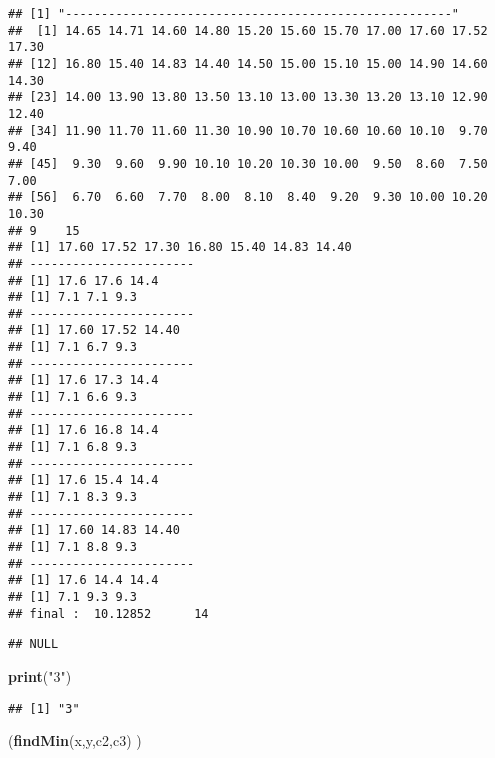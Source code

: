 \documentclass[]{article}
\newenvironment{Shaded}{\begin{snugshade}}{\end{snugshade}}
\newcommand{\KeywordTok}[1]{\textcolor[rgb]{0.13,0.29,0.53}{\textbf{#1}}}
\newcommand{\StringTok}[1]{\textcolor[rgb]{0.31,0.60,0.02}{#1}}
\newcommand{\NormalTok}[1]{#1}
\begin{document}
\begin{verbatim}
## [1] "------------------------------------------------------"
##  [1] 14.65 14.71 14.60 14.80 15.20 15.60 15.70 17.00 17.60 17.52 17.30
## [12] 16.80 15.40 14.83 14.40 14.50 15.00 15.10 15.00 14.90 14.60 14.30
## [23] 14.00 13.90 13.80 13.50 13.10 13.00 13.30 13.20 13.10 12.90 12.40
## [34] 11.90 11.70 11.60 11.30 10.90 10.70 10.60 10.60 10.10  9.70  9.40
## [45]  9.30  9.60  9.90 10.10 10.20 10.30 10.00  9.50  8.60  7.50  7.00
## [56]  6.70  6.60  7.70  8.00  8.10  8.40  9.20  9.30 10.00 10.20 10.30
## 9    15 
## [1] 17.60 17.52 17.30 16.80 15.40 14.83 14.40
## -----------------------
## [1] 17.6 17.6 14.4
## [1] 7.1 7.1 9.3
## -----------------------
## [1] 17.60 17.52 14.40
## [1] 7.1 6.7 9.3
## -----------------------
## [1] 17.6 17.3 14.4
## [1] 7.1 6.6 9.3
## -----------------------
## [1] 17.6 16.8 14.4
## [1] 7.1 6.8 9.3
## -----------------------
## [1] 17.6 15.4 14.4
## [1] 7.1 8.3 9.3
## -----------------------
## [1] 17.60 14.83 14.40
## [1] 7.1 8.8 9.3
## -----------------------
## [1] 17.6 14.4 14.4
## [1] 7.1 9.3 9.3
## final :  10.12852      14
\end{verbatim}

\begin{verbatim}
## NULL
\end{verbatim}

\begin{Shaded}
\begin{Highlighting}[]
\KeywordTok{print}\NormalTok{(}\StringTok{"3"}\NormalTok{)}
\end{Highlighting}
\end{Shaded}

\begin{verbatim}
## [1] "3"
\end{verbatim}

\begin{Shaded}
\begin{Highlighting}[]
\NormalTok{(}\KeywordTok{findMin}\NormalTok{(x,y,c2,c3) )}
\end{Highlighting}
\end{Shaded}
\end{document}
